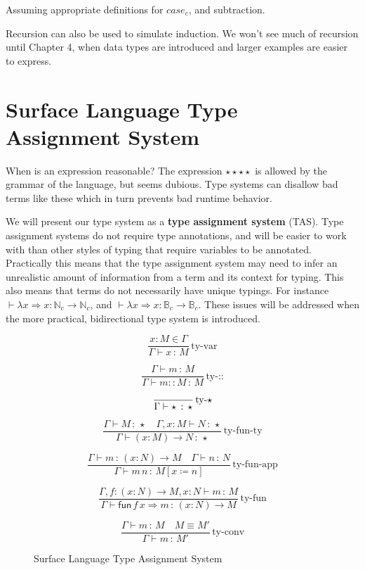 Assuming appropriate definitions for $case_{c}$, and subtraction.

Recursion can also be used to simulate induction. 
We won't see much of recursion until Chapter 4, when data types are introduced and larger examples are easier to express.

\section{Surface Language Type Assignment System}

When is an expression reasonable? The expression $\star\star\star\star$ is allowed by the grammar of the language, but seems dubious.
Type systems can disallow bad terms like these which in turn prevents bad runtime behavior.

We will present our type system as a \textbf{type assignment system} (\ac{TAS}).
Type assignment systems do not require type annotations, and will be easier to work with than other styles of typing that require variables to be annotated.
Practically this means that the type assignment system may need to infer an unrealistic amount of information from a term and its context for typing.
This also means that terms do not necessarily have unique typings.
For instance $\vdash\lambda x\Rightarrow x:\mathbb{N}_{c}\rightarrow\mathbb{N}_{c}$, and $\vdash\lambda x\Rightarrow x:\mathbb{B}_{c}\rightarrow\mathbb{B}_{c}$.
These issues will be addressed when the more practical, bidirectional type system is introduced. 

\begin{figure}
\[
\frac{x:M\in\Gamma}{\Gamma\vdash x\,:\,M}\,\textrm{ty-var}
\]

\[
\frac{\Gamma\vdash m\,:\,M}{\Gamma\vdash m::M\,:\,M}\,\textrm{ty-::}
\]

\[
\frac{{\color{gray}\ }}{\Gamma\vdash\star\,:\,\star}\,\textrm{ty-}\star
\]

\[
\frac{\Gamma\vdash M\,:\,\star\quad\Gamma,x:M\vdash N\,:\,\star}{\Gamma\vdash\left(x:M\right)\rightarrow N\,:\,\star}\,\textrm{ty-fun-ty}
\]

\[
\frac{\Gamma\vdash m\,:\,\left(x:N\right)\rightarrow M\quad\Gamma\vdash n\,:\,N}{\Gamma\vdash m\,n\,:\,M\left[x\coloneqq n\right]}\,\textrm{ty-fun-app}
\]

\[
\frac{\Gamma,f:\left(x:N\right)\rightarrow M,x:N\vdash m\,:\,M}{\Gamma\vdash\mathsf{fun}\,f\,x\Rightarrow m\,:\,\left(x:N\right)\rightarrow M}\,\textrm{ty-fun}
\]

\[
\frac{\Gamma\vdash m\,:\,M\quad M\equiv M'}{\Gamma\vdash m\,:\,M'}\,\textrm{ty-conv}
\]


\caption{Surface Language Type Assignment System}
\label{fig:surface-TAS}
\end{figure}

